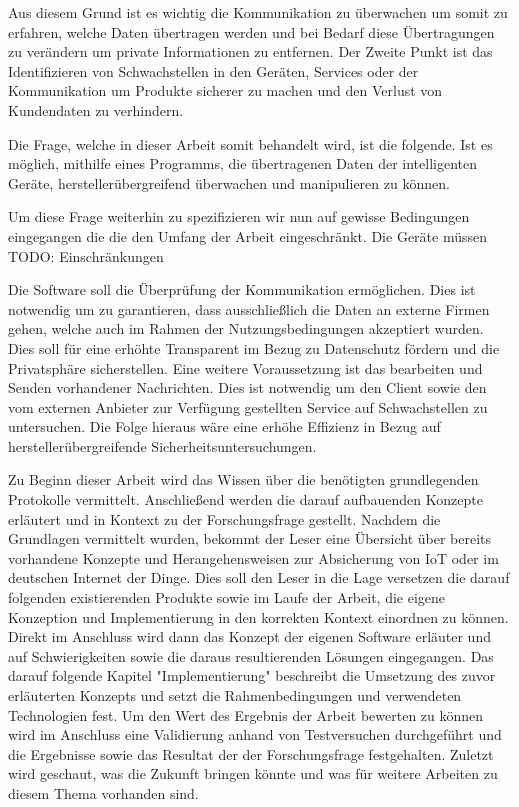     Aus diesem Grund ist es wichtig die Kommunikation zu überwachen um somit zu erfahren, welche Daten übertragen werden und bei Bedarf diese Übertragungen zu verändern um private Informationen zu entfernen.
    Der Zweite Punkt ist das Identifizieren von Schwachstellen in den Geräten, Services oder der Kommunikation um Produkte sicherer zu machen und den Verlust von Kundendaten zu verhindern.
    
    Die Frage, welche in dieser Arbeit somit behandelt wird, ist die folgende.
    Ist es möglich, mithilfe eines Programms, die übertragenen Daten der intelligenten Geräte, herstellerübergreifend überwachen und manipulieren zu können.
    
    Um diese Frage weiterhin zu spezifizieren wir nun auf gewisse Bedingungen eingegangen die die den Umfang der Arbeit eingeschränkt.
    Die Geräte müssen 
    TODO: Einschränkungen
    
    Die Software soll die Überprüfung der Kommunikation ermöglichen. Dies ist notwendig um zu garantieren, dass ausschließlich die Daten an externe Firmen gehen, welche auch im Rahmen der Nutzungsbedingungen akzeptiert wurden. Dies soll für eine erhöhte Transparent im Bezug zu Datenschutz fördern und die Privatsphäre sicherstellen.
    Eine weitere Voraussetzung ist das bearbeiten und Senden vorhandener Nachrichten. Dies ist notwendig um den Client sowie den vom externen Anbieter zur Verfügung gestellten Service auf Schwachstellen zu untersuchen. Die Folge hieraus wäre eine erhöhe Effizienz in Bezug auf herstellerübergreifende Sicherheitsuntersuchungen.


Zu Beginn dieser Arbeit wird das Wissen über die benötigten grundlegenden Protokolle vermittelt.
Anschließend werden die darauf aufbauenden Konzepte erläutert und in Kontext zu der Forschungsfrage gestellt.
Nachdem die Grundlagen vermittelt wurden, bekommt der Leser eine Übersicht über bereits vorhandene Konzepte und Herangehensweisen zur Absicherung von \ac{IoT} oder im deutschen Internet der Dinge. Dies soll den Leser in die Lage versetzen die darauf folgenden existierenden Produkte sowie im Laufe der Arbeit, die eigene Konzeption und Implementierung in den korrekten Kontext einordnen zu können.
Direkt im Anschluss wird dann das Konzept der eigenen Software erläuter und auf Schwierigkeiten sowie die daraus resultierenden Lösungen eingegangen. Das darauf folgende Kapitel "Implementierung" beschreibt die Umsetzung des zuvor erläuterten Konzepts und setzt die Rahmenbedingungen und verwendeten Technologien fest. Um den Wert des Ergebnis der Arbeit bewerten zu können wird im Anschluss eine Validierung anhand von Testversuchen durchgeführt und die Ergebnisse sowie das Resultat der der Forschungsfrage festgehalten. Zuletzt wird geschaut, was die Zukunft bringen könnte und was für weitere Arbeiten zu diesem Thema vorhanden sind.